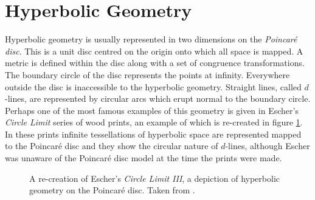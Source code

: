 
\section{Hyperbolic Geometry}

Hyperbolic geometry is usually represented in two dimensions on the
\emph{Poincar\'e disc}. This is a unit disc centred on the origin
onto which all space is mapped. A metric is defined within the
disc\cite{GEOM:Brannan} along with a set of congruence transformations.
The boundary circle of the disc represents the points at infinity. Everywhere
outside the disc is inaccessible to the hyperbolic geometry. Straight lines,
called $d$-lines\cite{GEOM:Brannan}, are represented by circular arcs which
erupt normal to the boundary circle. Perhaps one of the most famous examples of this
geometry is given in Escher's \emph{Circle Limit} series of wood prints, an example of
which is re-created in figure \ref{fig:circlelimit}. In these prints infinite
tessellations of hyperbolic space are represented mapped to the Poincar\'e
disc and they show the circular nature of $d$-lines, although Escher was
unaware of the Poincar\'e disc model at the time the prints were made.

\begin{figure} \centering
{}
\caption{A re-creation of Escher's \emph{Circle Limit III}, 
a depiction of hyperbolic geometry on the Poincar\'e disc.
Taken from \cite{transhyp}.}
\label{fig:circlelimit}
\end{figure}

